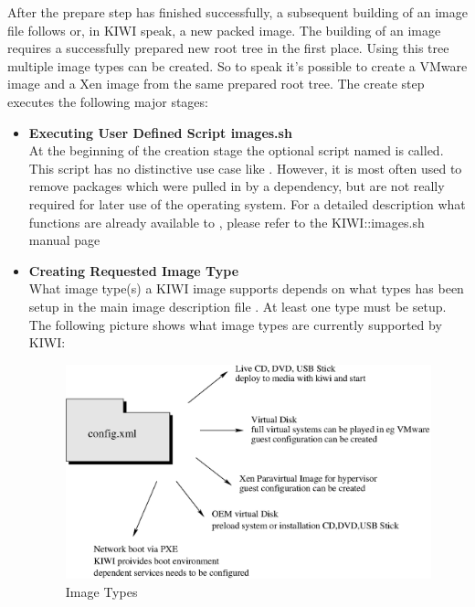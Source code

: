 After the prepare step has finished successfully, a subsequent building of
an image file follows or, in KIWI speak, a new packed image.
The building of an image requires a successfully prepared new root
tree in the first place. Using this tree multiple image types can be
created. So to speak it's possible to create a VMware image and a
Xen image from the same prepared root tree. The create step executes the
following major stages:

\begin{itemize}
\item \textbf{Executing User Defined Script images.sh}\\
      At the beginning of the creation stage the optional script named
       is called. This script has no distinctive use case like
      . However, it is most often used to remove packages which were pulled
      in by a dependency, but are not really required for later use
      of the operating system. For a detailed description what
      functions are already available to , please refer to
      the KIWI::images.sh manual page
\item \textbf{Creating Requested Image Type}\\
      What image type(s) a KIWI image supports depends on what types has been
      setup in the main image description file . At least one type
      must be setup. The following picture shows what image types are
      currently supported by KIWI:

      \begin{figure}[h]
      \centering
      \includegraphics[scale=0.5]{pictures/types.eps}
      \caption{Image Types}
      \label{fig:types}
      \end{figure}
\end{itemize}

